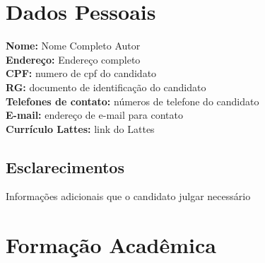 \documentclass[a4paper,oneside,12pt]{article}
\newcommand{\Author}{Nome Completo Autor}
\newcounter{document}%
\begin{document}
\newpage
\section{Dados Pessoais}

\doublespacing
\noindent\textbf{Nome:} \Author \\
\textbf{Endereço:} Endereço completo  \\
\textbf{CPF:} numero de cpf do candidato  \\
\textbf{RG:} documento de identificação do candidato \\
\textbf{Telefones de contato:} números de telefone do candidato\\
\textbf{E-mail:} endereço de e-mail para contato \\
\textbf{Currículo Lattes:} link do Lattes




\subsection{Esclarecimentos}

Informações adicionais que o candidato julgar necessário



\section{Formação Acadêmica}
\singlespacing
\end{document}
